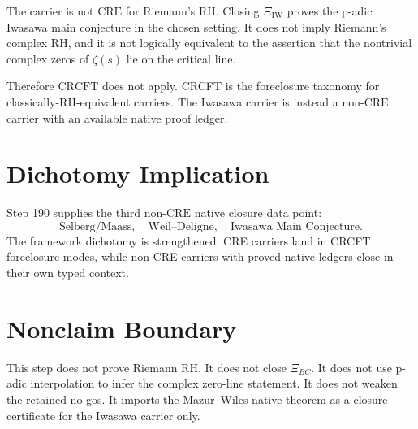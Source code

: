 \documentclass[11pt]{article}
\newcommand{\XiIW}{\Xi_{\mathrm{IW}}}
\newcommand{\CRE}{\mathrm{CRE}}
\newcommand{\CRCFT}{\mathrm{CRCFT}}
\begin{document}
The carrier is not \(\CRE\) for Riemann's RH.  Closing \(\XiIW\) proves the p-adic Iwasawa main conjecture in the chosen setting.  It does not imply Riemann's complex RH, and it is not logically equivalent to the assertion that the nontrivial complex zeros of \(\zeta(s)\) lie on the critical line.

Therefore \(\CRCFT\) does not apply.  CRCFT is the foreclosure taxonomy for classically-RH-equivalent carriers.  The Iwasawa carrier is instead a non-\(\CRE\) carrier with an available native proof ledger.

\section*{Dichotomy Implication}

Step 190 supplies the third non-\(\CRE\) native closure data point:
\[
\text{Selberg/Maass},\quad
\text{Weil--Deligne},\quad
\text{Iwasawa Main Conjecture}.
\]
The framework dichotomy is strengthened: CRE carriers land in CRCFT foreclosure modes, while non-CRE carriers with proved native ledgers close in their own typed context.

\section*{Nonclaim Boundary}

This step does not prove Riemann RH.  It does not close \(\Xi_{BC}\).  It does not use p-adic interpolation to infer the complex zero-line statement.  It does not weaken the retained no-gos.  It imports the Mazur--Wiles native theorem as a closure certificate for the Iwasawa carrier only.
\end{document}
